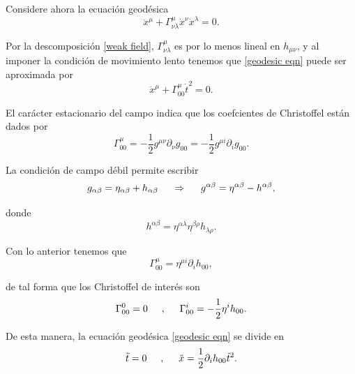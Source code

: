 \documentclass[16pt,a4paper]{article}
\numberwithin{equation}{section}
\theoremstyle{definition}
\begin{document}
Considere ahora la ecuación geodésica 
\begin{equation}
\label{geodesic eqn}
\ddot{x}^\mu + \Gamma^{\mu}_{\nu \lambda}\dot{x}^\nu\dot{x}^\lambda = 0.
\end{equation}

Por la descomposición \eqref{weak field}, $\Gamma^{\mu}_{\nu \lambda}$ es por lo menos lineal en $h_{\mu \nu}$, y al imponer la condición de movimiento lento tenemos que \eqref{geodesic eqn} puede ser aproximada por
\begin{equation*}
\ddot{x}^\mu + \Gamma^{\mu}_{00}\dot{t}^2 = 0.
\end{equation*}

El carácter estacionario del campo indica que los coefcientes de Christoffel están dados por 
\begin{equation*}
\Gamma^{\mu}_{00} = -\frac{1}{2}g^{\mu \nu}\partial_\nu g_{00} = -\frac{1}{2}g^{\mu i}\partial_i g_{00}.
\end{equation*}

La condición de campo débil permite escribir
\begin{equation*}
g_{\alpha \beta} = \eta_{\alpha \beta} + h_{\alpha \beta} \hspace{.5cm} \Rightarrow \hspace{.5cm} g^{\alpha \beta} = \eta^{\alpha \beta} - h^{\alpha \beta},
\end{equation*}

donde 
\begin{equation*}
h^{\alpha \beta} = \eta^{\alpha \lambda}\eta^{\beta \rho}h_{\lambda \rho}.
\end{equation*}

Con lo anterior tenemos que 
\begin{equation*}
\Gamma^{\mu}_{00} = \eta^{\mu i}\partial_ih_{00},
\end{equation*}

de tal forma que los Christoffel de interés son
\begin{equation*}
\Gamma^{0}_{00} = 0 \hspace{.5cm},\hspace{.5cm} \Gamma^{i}_{00} = -\frac{1}{2}\eta^ih_{00}.
\end{equation*}

De esta manera, la ecuación geodésica \eqref{geodesic eqn} se divide en
\begin{equation*}
\ddot{t} = 0 \hspace{.5cm},\hspace{.5cm} \ddot{x} = \frac{1}{2}\partial_ih_{00}\dot{t}^2.
\end{equation*}
\end{document}
